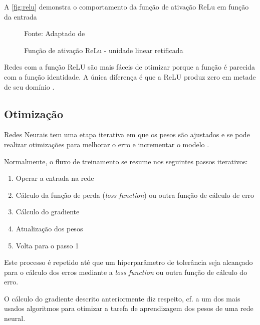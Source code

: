 A \autoref{fig:relu} demonstra o comportamento da função de ativação ReLu em função da entrada

\begin{figure}[h!]
	\centering
	\caption{Função de ativação ReLu - unidade linear retificada}
	
	{\scriptsize 	Fonte: Adaptado de }
	\label{fig:relu}
\end{figure}

Redes com a função ReLU são mais fáceis de otimizar porque a função é parecida com a função identidade. A única diferença é que a ReLU produz zero em metade de seu domínio \cite{hagan_neural_1996}.

\subsection{Otimização}\label{otimização}
Redes Neurais tem uma etapa iterativa em que os pesos são ajustados e se pode realizar otimizações para melhorar o erro e incrementar o modelo \cite{haykin_redes_2001}.

Normalmente, o fluxo de treinamento se resume nos seguintes passos iterativos:
\begin{enumerate}\label{fluxo_treinamento}
	\item Operar a entrada na rede
	\item Cálculo da função de perda (\textit{loss function}) ou outra função de cálculo de erro
	\item Cálculo do gradiente
	\item Atualização dos pesos
	\item Volta para o passo 1
\end{enumerate}

Este processo é repetido até que um hiperparâmetro de tolerância seja alcançado para o cálculo dos erros mediante a \textit{loss function} ou outra função de cálculo do erro.

O cálculo do gradiente descrito anteriormente diz respeito, cf.  a um dos mais usados algoritmos para otimizar a tarefa de aprendizagem dos pesos de uma rede neural.

